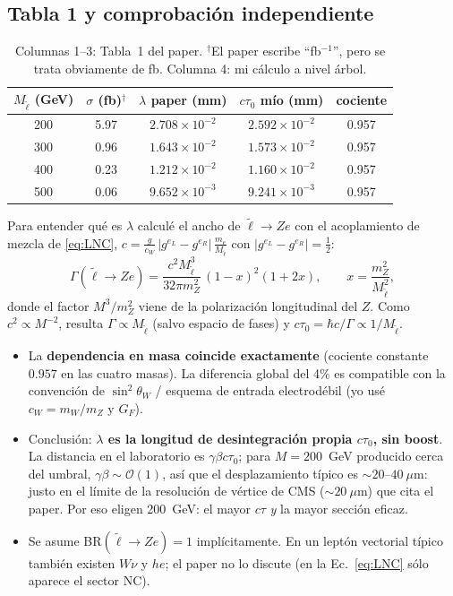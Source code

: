 \documentclass[11pt,a4paper]{article}
\newcommand{\lt}{\tilde{\ell}}
\begin{document}
\subsection{Tabla 1 y comprobación independiente}
\begin{table}[h]
\centering
\begin{tabular}{cccc|c}
\toprule
$M_{\lt}$ (GeV) & $\sigma$ (fb)$^{\dagger}$ & $\lambda$ paper (mm) & $c\tau_0$ mío (mm) & cociente\\
\midrule
200 & 5.97 & $2.708\times10^{-2}$ & $2.592\times10^{-2}$ & 0.957\\
300 & 0.96 & $1.643\times10^{-2}$ & $1.573\times10^{-2}$ & 0.957\\
400 & 0.23 & $1.212\times10^{-2}$ & $1.160\times10^{-2}$ & 0.957\\
500 & 0.06 & $9.652\times10^{-3}$ & $9.241\times10^{-3}$ & 0.957\\
\bottomrule
\end{tabular}
\caption{Columnas 1--3: Tabla~1 del paper. $^{\dagger}$El paper escribe ``fb$^{-1}$'', pero se trata obviamente de fb. Columna 4: mi cálculo a nivel árbol.}
\label{tab:lambda}
\end{table}

Para entender qué es $\lambda$ calculé el ancho de $\lt\to Ze$ con el acoplamiento de mezcla de \eqref{eq:LNC}, $c=\frac{g}{c_W}\,\big|g^{e_L}-g^{e_R}\big|\,\frac{m_e}{M_{\lt}}$ con $|g^{e_L}-g^{e_R}|=\tfrac12$:
\begin{equation}
\Gamma(\lt\to Ze)=\frac{c^2M_{\lt}^3}{32\pi m_Z^2}\,(1-x)^2(1+2x),\qquad x=\frac{m_Z^2}{M_{\lt}^2},
\end{equation}
donde el factor $M^3/m_Z^2$ viene de la polarización longitudinal del $Z$. Como $c^2\propto M^{-2}$, resulta $\Gamma\propto M_{\lt}$ (salvo espacio de fases) y $c\tau_0=\hbar c/\Gamma\propto 1/M_{\lt}$.
\begin{itemize}
\item La \textbf{dependencia en masa coincide exactamente} (cociente constante $0.957$ en las cuatro masas). La diferencia global del 4\% es compatible con la convención de $\sin^2\theta_W$ / esquema de entrada electrodébil (yo usé $c_W=m_W/m_Z$ y $G_F$).
\item Conclusión: \textbf{$\lambda$ es la longitud de desintegración propia $c\tau_0$, sin boost}. La distancia en el laboratorio es $\gamma\beta c\tau_0$; para $M=200$~GeV producido cerca del umbral, $\gamma\beta\sim\mathcal{O}(1)$, así que el desplazamiento típico es $\sim 20$--$40~\mu$m: justo en el límite de la resolución de vértice de CMS ($\sim 20~\mu$m) que cita el paper. Por eso eligen 200~GeV: el mayor $c\tau$ \emph{y} la mayor sección eficaz.
\item Se asume BR$(\lt\to Ze)=1$ implícitamente. En un leptón vectorial típico también existen $W\nu$ y $he$; el paper no lo discute (en la Ec.~\eqref{eq:LNC} sólo aparece el sector NC).
\end{itemize}
\end{document}
